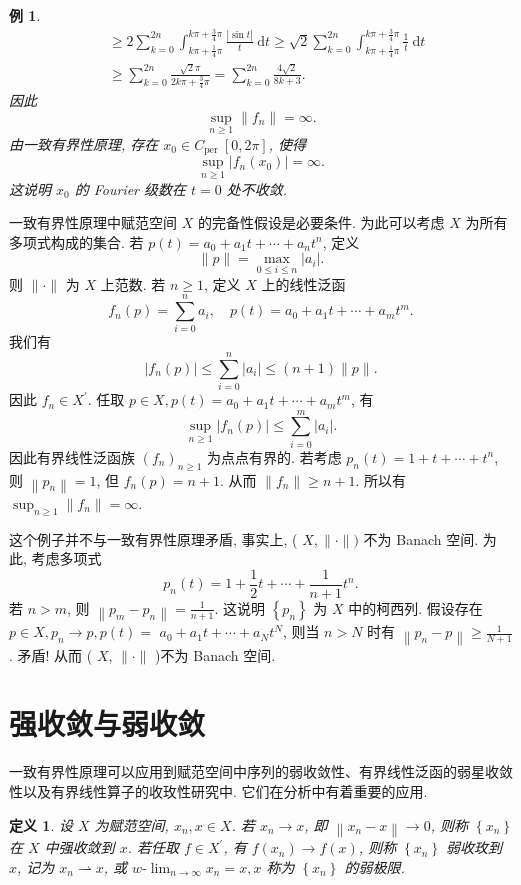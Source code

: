 \documentclass[openany]{ctexbook}
\theoremstyle{kaiti}
\newtheorem{definition}{定义}[section]
\theoremstyle{normal}
\newtheorem{example}{例}[section]
\begin{document}
\begin{example}
$$\begin{aligned}
& \geqslant 2 \sum_{k=0}^{2 n} \int_{k \pi+\frac{1}{4} \pi}^{k \pi+\frac{3}{4} \pi} \frac{|\sin t|}{t} \mathrm{~d} t \geqslant \sqrt{2} \sum_{k=0}^{2 n} \int_{k \pi+\frac{1}{4} \pi}^{k \pi+\frac{3}{4} \pi} \frac{1}{t} \mathrm{~d} t \\
& \geqslant \sum_{k=0}^{2 n} \frac{\sqrt{2} \pi}{2 k \pi+\frac{3}{4} \pi}=\sum_{k=0}^{2 n} \frac{4 \sqrt{2}}{8 k+3}.
\end{aligned}
$$
因此
$$
\sup_{n \geqslant 1}\left\|f_n\right\|=\infty.
$$
由一致有界性原理, 存在 $x_0 \in C_{\text {per }}[0,2 \pi]$, 使得
$$
\sup_{n \geqslant 1}\left|f_n\left(x_0\right)\right|=\infty.
$$
这说明 $x_0$ 的 Fourier 级数在 $t=0$ 处不收敛.
\end{example}

一致有界性原理中赋范空间 $X$ 的完备性假设是必要条件. 为此可以考虑 $X$ 为所有多项式构成的集合. 若 $p(t)=a_0+a_1 t+\cdots+a_n t^n$, 定义
$$
\|p\|=\max_{0 \leqslant i \leqslant n}\left|a_{i}\right|.
$$
则 $\|\cdot\|$ 为 $X$ 上范数. 若 $n \geqslant 1$, 定义 $X$ 上的线性泛函
$$
f_n(p)=\sum_{i=0}^n a_{i}, \quad p(t)=a_0+a_1 t+\cdots+a_m t^m.
$$
我们有
$$
\left|f_n(p)\right| \leqslant \sum_{i=0}^n\left|a_{i}\right| \leqslant(n+1) \|p\|.
$$
因此 $f_n \in X^{\prime}$. 任取 $p \in X, p(t)=a_0+a_1 t+\cdots+a_m t^m$, 有
$$
\sup_{n \geqslant 1}\left|f_n(p)\right| \leqslant \sum_{i=0}^m\left|a_{i}\right|.
$$
因此有界线性泛函族 $\left(f_n\right)_{n \geqslant 1}$ 为点点有界的. 若考虑 $p_n(t)=1+t+\cdots+t^n$, 则 $\left\|p_n\right\|=1$, 但 $f_n(p)=n+1$. 从而 $\left\|f_n\right\| \geqslant n+1$. 所以有 $\sup_{n \geqslant 1}\left\|f_n\right\|=\infty$.

这个例子并不与一致有界性原理矛盾, 事实上, ( $X,\|\cdot\|)$ 不为 Banach 空间. 为此, 考虑多项式
$$
p_n(t)=1+\frac{1}{2} t+\cdots+\frac{1}{n+1} t^n.
$$
若 $n>m$, 则 $\left\|p_m-p_n\right\|=\frac{1}{n+1}$. 这说明 $\left\{p_n\right\}$ 为 $X$ 中的柯西列. 假设存在 $p \in X, p_n \rightarrow p, p(t)=$ $a_0+a_1 t+\cdots+a_{N} t^{N}$, 则当 $n>N$ 时有 $\left\|p_n-p\right\| \geqslant \frac{1}{N+1}$. 矛盾! 从而 ( $X$, $\|\cdot\|$ )不为 Banach 空间.

\section{强收敛与弱收敛}

一致有界性原理可以应用到赋范空间中序列的弱收敛性、有界线性泛函的弱星收敛性以及有界线性算子的收玫性研究中. 它们在分析中有着重要的应用.

\begin{definition}
设 $X$ 为赋范空间, $x_n, x \in X$. 若 $x_n \rightarrow x$, 即 $\left\|x_n-x\right\| \rightarrow 0$, 则称 $\left\{x_n\right\}$ 在 $X$ 中强收敛到 $x$. 若任取 $f \in X^{\prime}$, 有 $f\left(x_n\right) \rightarrow f(x)$, 则称 $\left\{x_n\right\}$ 弱收玫到 $x$, 记为 $x_n \rightharpoonup x$, 或 $w\text{-}\lim_{n \rightarrow \infty} x_n=x, x$ 称为 $\left\{x_n\right\}$ 的弱极限.
\end{definition}
\end{document}
